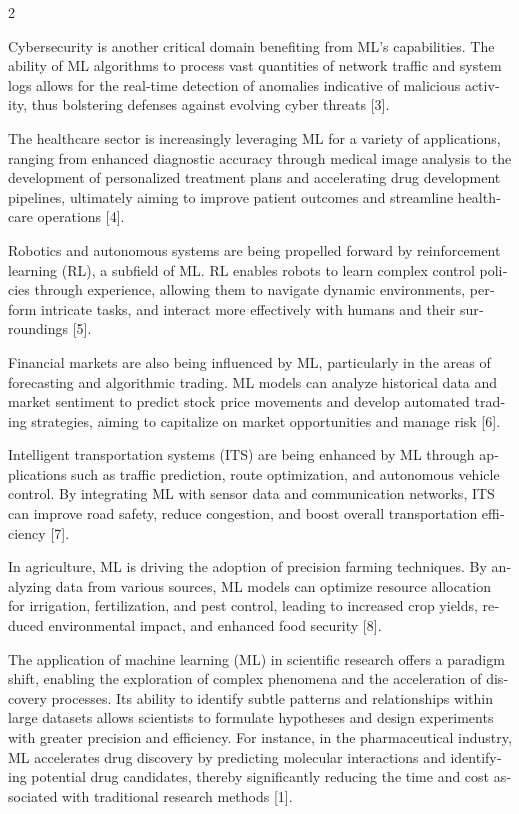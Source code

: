 \documentclass{article}
\begin{document}
\begin{multicols}{2}
\begin{otherlanguage}{english}
Cybersecurity is another critical domain benefiting from ML's capabilities. The ability of ML algorithms to process vast quantities of network traffic and system logs allows for the real-time detection of anomalies indicative of malicious activity, thus bolstering defenses against evolving cyber threats [3].

The healthcare sector is increasingly leveraging ML for a variety of applications, ranging from enhanced diagnostic accuracy through medical image analysis to the development of personalized treatment plans and accelerating drug development pipelines, ultimately aiming to improve patient outcomes and streamline healthcare operations [4].

Robotics and autonomous systems are being propelled forward by reinforcement learning (RL), a subfield of ML. RL enables robots to learn complex control policies through experience, allowing them to navigate dynamic environments, perform intricate tasks, and interact more effectively with humans and their surroundings [5].

Financial markets are also being influenced by ML, particularly in the areas of forecasting and algorithmic trading. ML models can analyze historical data and market sentiment to predict stock price movements and develop automated trading strategies, aiming to capitalize on market opportunities and manage risk [6].

Intelligent transportation systems (ITS) are being enhanced by ML through applications such as traffic prediction, route optimization, and autonomous vehicle control. By integrating ML with sensor data and communication networks, ITS can improve road safety, reduce congestion, and boost overall transportation efficiency [7].

In agriculture, ML is driving the adoption of precision farming techniques. By analyzing data from various sources, ML models can optimize resource allocation for irrigation, fertilization, and pest control, leading to increased crop yields, reduced environmental impact, and enhanced food security [8].
\end{otherlanguage}
\vspace*{2pt}

\par
\vspace*{2pt}
\begin{otherlanguage}{english}
\noindent The application of machine learning (ML) in scientific research offers a paradigm shift, enabling the exploration of complex phenomena and the acceleration of discovery processes. Its ability to identify subtle patterns and relationships within large datasets allows scientists to formulate hypotheses and design experiments with greater precision and efficiency. For instance, in the pharmaceutical industry, ML accelerates drug discovery by predicting molecular interactions and identifying potential drug candidates, thereby significantly reducing the time and cost associated with traditional research methods [1].


\end{otherlanguage}
\end{multicols}
\end{document}
